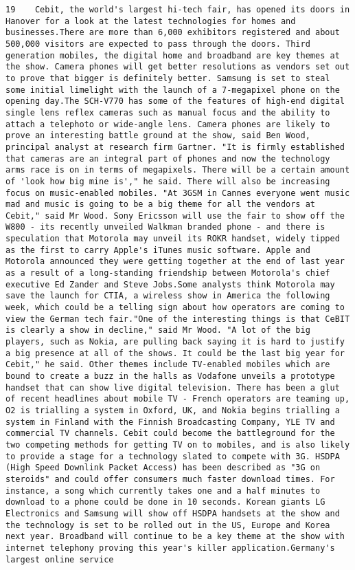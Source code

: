 \documentclass[11pt]{article}
\begin{document}
\begin{Verbatim}[commandchars=\\\{\}]
         19    Cebit, the world's largest hi-tech fair, has opened its doors in Hanover for a look at the latest technologies for homes and businesses.There are more than 6,000 exhibitors registered and about 500,000 visitors are expected to pass through the doors. Third generation mobiles, the digital home and broadband are key themes at the show. Camera phones will get better resolutions as vendors set out to prove that bigger is definitely better. Samsung is set to steal some initial limelight with the launch of a 7-megapixel phone on the opening day.The SCH-V770 has some of the features of high-end digital single lens reflex cameras such as manual focus and the ability to attach a telephoto or wide-angle lens. Camera phones are likely to prove an interesting battle ground at the show, said Ben Wood, principal analyst at research firm Gartner. "It is firmly established that cameras are an integral part of phones and now the technology arms race is on in terms of megapixels. There will be a certain amount of 'look how big mine is'," he said. There will also be increasing focus on music-enabled mobiles. "At 3GSM in Cannes everyone went music mad and music is going to be a big theme for all the vendors at Cebit," said Mr Wood. Sony Ericsson will use the fair to show off the W800 - its recently unveiled Walkman branded phone - and there is speculation that Motorola may unveil its ROKR handset, widely tipped as the first to carry Apple's iTunes music software. Apple and Motorola announced they were getting together at the end of last year as a result of a long-standing friendship between Motorola's chief executive Ed Zander and Steve Jobs.Some analysts think Motorola may save the launch for CTIA, a wireless show in America the following week, which could be a telling sign about how operators are coming to view the German tech fair."One of the interesting things is that CeBIT is clearly a show in decline," said Mr Wood. "A lot of the big players, such as Nokia, are pulling back saying it is hard to justify a big presence at all of the shows. It could be the last big year for Cebit," he said. Other themes include TV-enabled mobiles which are bound to create a buzz in the halls as Vodafone unveils a prototype handset that can show live digital television. There has been a glut of recent headlines about mobile TV - French operators are teaming up, O2 is trialling a system in Oxford, UK, and Nokia begins trialling a system in Finland with the Finnish Broadcasting Company, YLE TV and commercial TV channels. Cebit could become the battleground for the two competing methods for getting TV on to mobiles, and is also likely to provide a stage for a technology slated to compete with 3G. HSDPA (High Speed Downlink Packet Access) has been described as "3G on steroids" and could offer consumers much faster download times. For instance, a song which currently takes one and a half minutes to download to a phone could be done in 10 seconds. Korean giants LG Electronics and Samsung will show off HSDPA handsets at the show and the technology is set to be rolled out in the US, Europe and Korea next year. Broadband will continue to be a key theme at the show with internet telephony proving this year's killer application.Germany's largest online service 
\end{Verbatim}
\end{document}
